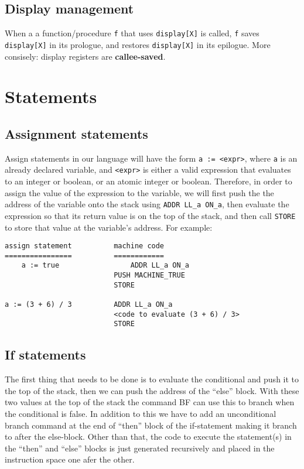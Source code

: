 \documentclass[11pt]{article}
\begin{document}
\subsection{Display management}

When a a function/procedure \texttt{f} that uses \texttt{display[X]} is called, \texttt{f} saves \texttt{display[X]} in its prologue, and restores \texttt{display[X]} in its epilogue. More consisely: display registers are \textbf{callee-saved}.

\section{Statements}

\subsection{Assignment statements}

Assign statements in our language will have the form \texttt{a := <expr>}, where \texttt{a} is an already declared variable, and \texttt{<expr>} is either a valid expression that evaluates to an integer or boolean, or an atomic integer or boolean. Therefore, in order to assign the value of the expression to the variable, we will first push the the address of the variable onto the stack using \texttt{ADDR LL\_a ON\_a}, then evaluate the expression so that its return value is on the top of the stack, and then call \texttt{STORE} to store that value at the variable's address. For example:

\begin{verbatim}
assign statement          machine code
================          ============
    a := true                 ADDR LL_a ON_a
                          PUSH MACHINE_TRUE
                          STORE

a := (3 + 6) / 3          ADDR LL_a ON_a
                          <code to evaluate (3 + 6) / 3>
                          STORE
\end{verbatim}

\subsection{If statements}

The first thing that needs to be done is to evaluate the conditional and push it to the top of the stack, then we can push the address of the ``else'' block. With these two values at the top of the stack the command BF can use this to branch when the conditional is false. In addition to this we have to add an unconditional branch command at the end of ``then'' block of the if-statement making it branch to after the else-block. Other than that, the code to execute the statement(s) in the ``then'' and ``else'' blocks is just generated recursively and placed in the instruction space one afer the other.
\end{document}
